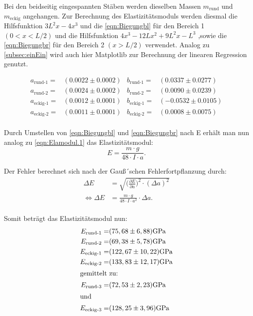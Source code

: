 Bei den beidseitig eingespannten Stäben werden dieselben Massen $m_{\text{rund}}$ und $m_{\text{eckig}}$ angehangen.
Zur Berechnung des Elastizitätsmoduls werden diesmal die Hilfsfunktion $3L^2x - 4x^3$ und die \autoref{eqn:Biegungbl} für den Bereich 1 $(0<x<L/2)$ und die Hilfsfunktion $4x^3-12Lx^2+9L^2x-L^3$ ,sowie die \autoref{eqn:Biegungbr} für den Bereich 2 $(x>L/2)$
verwendet. Analog zu \autoref{subsec:einEin} wird auch hier Matplotlib zur Berechnung der linearen Regression genutzt.

\begin{align*}
  a_{\text{rund-1}} =&(0.0022 ± 0.0002) & b_{\text{rund-1}}=& (0.0337 ± 0.0277)\\
  a_{\text{rund-2}} =&(0.0024 ± 0.0002) & b_{\text{rund-2}}=& (0.0090 ± 0.0239)\\
  a_{\text{eckig-1}} =&(0.0012 ± 0.0001) & b_{\text{eckig-1}}=& (-0.0532 ± 0.0105)\\
  a_{\text{eckig-2}} =&(0.0011 ± 0.0001) & b_{\text{eckig-2}}=& (0.0008 ± 0.0075)\\
 \end{align*}

 Durch Umstellen von \autoref{eqn:Biegungbl} und \autoref{eqn:Biegungbr} nach E erhält man nun analog zu \autoref{eqn:Elamodul.1} das Elastizitätsmodul:
 \begin{equation*}
  E = \frac{m\cdot g}{48\cdot I \cdot a}.
  \label{eqn:e-ein}
  \end{equation*}

Der Fehler berechnet sich nach der Gauß´schen Fehlerfortpflanzung durch:
\begin{equation*}
  \begin{aligned}
  \Delta E &= \sqrt{\biggl(\frac{\partial E}{\partial a}\biggr)^2\cdot (\Delta a)^2} \\
  \iff \Delta E &= \frac{m\cdot g}{48\cdot I \cdot a^2} \cdot \Delta a.\\
  \label{eqn:e-fehler-beid}
  \end{aligned}
  \end{equation*}

Somit beträgt das Elastizitätsmodul nun:
\begin{align*}
  E_{\text{rund-1}}=&(75,68\pm6,88)\si{\giga\pascal}\\
  E_{\text{rund-2}}=&(69,38\pm5,78)\si{\giga\pascal}\\
  E_{\text{eckig-1}}=&(122,67\pm10,22)\si{\giga\pascal}\\
  E_{\text{eckig-2}}=&(133,83\pm12,17)\si{\giga\pascal}\\
  \intertext{gemittelt zu:}
  E_{\text{rund-3}}=&(72,53\pm2,23)\si{\giga\pascal}\\
  \intertext{und}
  E_{\text{eckig-3}}=&(128,25\pm3,96)\si{\giga\pascal}\\
  \label{eqn:Ebeid} 
\end{align*}

\pagebreak



